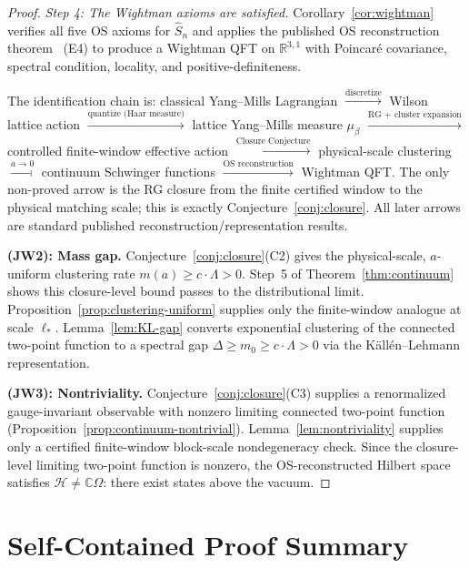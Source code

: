 \documentclass[11pt]{article}
\theoremstyle{definition}
\newcommand{\R}{\mathbb{R}}
\begin{document}
\begin{proof}
\emph{Step 4: The Wightman axioms are satisfied.}
Corollary~\ref{cor:wightman} verifies all five OS axioms
for $\hat S_n$ and applies the published OS
reconstruction theorem~\cite{OS73} (E4) to produce a
Wightman QFT on $\R^{3,1}$ with Poincar\'e covariance,
spectral condition, locality, and positive-definiteness.

The identification chain is:
classical Yang--Mills Lagrangian
$\xrightarrow{\text{discretize}}$ Wilson lattice action
$\xrightarrow{\text{quantize (Haar measure)}}$ lattice
Yang--Mills measure $\mu_\beta$
$\xrightarrow{\text{RG + cluster expansion}}$ controlled
finite-window effective action
$\xrightarrow{\text{Closure Conjecture}}$ physical-scale clustering
$\xrightarrow{a\to 0}$ continuum Schwinger functions
$\xrightarrow{\text{OS reconstruction}}$ Wightman QFT.
The only non-proved arrow is the RG closure from the finite certified
window to the physical matching scale; this is exactly
Conjecture~\ref{conj:closure}.  All later arrows are standard
published reconstruction/representation results.

\medskip
\textbf{(JW2): Mass gap.}
Conjecture~\ref{conj:closure}(C2) gives the
physical-scale, $a$-uniform clustering rate
$m(a)\ge c\cdot\Lambda>0$.
Step~5 of Theorem~\ref{thm:continuum} shows this closure-level bound
passes to the distributional limit.  Proposition~\ref{prop:clustering-uniform} supplies only the finite-window analogue at scale $\ell_*$.
Lemma~\ref{lem:KL-gap} converts exponential clustering
of the connected two-point function to a spectral gap
$\Delta\ge m_0\ge c\cdot\Lambda>0$ via the
K\"all\'en--Lehmann representation.

\medskip
\textbf{(JW3): Nontriviality.}
Conjecture~\ref{conj:closure}(C3) supplies a renormalized gauge-invariant observable with nonzero limiting connected two-point function (Proposition~\ref{prop:continuum-nontrivial}).  Lemma~\ref{lem:nontriviality} supplies only a certified finite-window block-scale nondegeneracy check.  Since the closure-level limiting two-point function is nonzero, the OS-reconstructed Hilbert space satisfies $\mathcal{H}\ne\mathbb{C}\Omega$: there exist states above the vacuum.
\end{proof}



\section{Self-Contained Proof Summary}\label{sec:summary}
\end{document}

